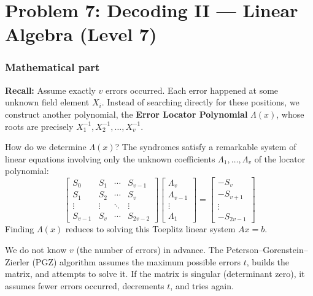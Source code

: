 \section*{Problem 7: Decoding II --- Linear Algebra (Level 7)}

\subsubsection*{Mathematical part}
\textbf{Recall:} Assume exactly $v$ errors occurred. Each error happened at some unknown field element $X_i$. Instead of searching directly for these positions, we construct another polynomial, the \textbf{Error Locator Polynomial} $\Lambda(x)$, whose roots are precisely $X_1^{-1}, X_2^{-1}, \ldots, X_v^{-1}$.

How do we determine $\Lambda(x)$? The syndromes satisfy a remarkable system of linear equations involving only the unknown coefficients $\Lambda_1, \dots, \Lambda_v$ of the locator polynomial:
\[
\begin{bmatrix}
S_0 & S_1 & \cdots & S_{v-1} \\
S_1 & S_2 & \cdots & S_{v} \\
\vdots & \vdots & \ddots & \vdots \\
S_{v-1} & S_{v} & \cdots & S_{2v-2}
\end{bmatrix}
\begin{bmatrix}
\Lambda_v \\ \Lambda_{v-1} \\ \vdots \\ \Lambda_1
\end{bmatrix}
=
\begin{bmatrix}
-S_v \\ -S_{v+1} \\ \vdots \\ -S_{2v-1}
\end{bmatrix}
\]
Finding $\Lambda(x)$ reduces to solving this Toeplitz linear system $Ax = b$. 

We do not know $v$ (the number of errors) in advance. The Peterson--Gorenstein--Zierler (PGZ) algorithm assumes the maximum possible errors $t$, builds the matrix, and attempts to solve it. If the matrix is singular (determinant zero), it assumes fewer errors occurred, decrements $t$, and tries again.

